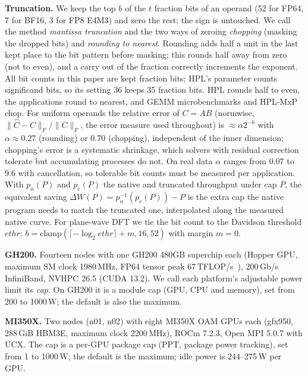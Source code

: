 \documentclass[conference]{IEEEtran}
\newcommand{\W}{\,W}
\begin{document}
\textbf{Truncation.} We keep the top $b$ of the $t$ fraction bits of an operand (52 for FP64, 7 for BF16, 3 for FP8
E4M3) and zero the rest; the sign is untouched. We call the method \emph{mantissa truncation} and the two ways of
zeroing \emph{chopping} (masking the dropped bits) and \emph{rounding to nearest}. Rounding adds half a unit in the last
kept place to the bit pattern before masking; this rounds half away from zero (not to even), and a carry out of the
fraction correctly increments the exponent. All bit counts in this paper are kept fraction bits; HPL's parameter counts
significand bits, so its setting 36 keeps 35 fraction bits. HPL rounds half to even, the applications round to nearest,
and GEMM microbenchmarks and HPL-MxP chop. For uniform operands the
relative error of $C=AB$ (normwise, $\|\hat C-C\|_F/\|C\|_F$, the error measure used throughout) is $\approx\alpha2^{-b}$ with $\alpha\approx0.27$ (rounding) or 0.70 (chopping), independent of
the inner dimension; chopping's error is a systematic shrinkage, which solvers with residual correction tolerate but
accumulating processes do not. On real data $\alpha$ ranges from 0.07 to 9.6 with cancellation, so tolerable bit counts
must be measured per application. With $p_n(P)$ and $p_r(P)$ the native and truncated throughput under cap $P$, the
equivalent saving $\Delta W(P)=p_n^{-1}(p_r(P))-P$ is the extra cap the native program needs to match the truncated one,
interpolated along the measured native curve. For plane-wave DFT we tie the bit count to the Davidson threshold
$\mathit{ethr}$: $b=\mathrm{clamp}(\lceil-\log_2\mathit{ethr}\rceil+m,16,52)$ with margin $m=0$.

\textbf{GH200.} Fourteen nodes with one GH200 480GB superchip each (Hopper GPU, maximum SM clock 1980\,MHz, FP64 tensor
peak 67\,TFLOP/s~\cite{NVIDIAGH200}), 200\,Gb/s InfiniBand, NVHPC 26.5 (CUDA 13.2). We call each platform's adjustable
power limit its \emph{cap}. On GH200 it is a module cap (GPU, CPU and memory), set from 200 to 1000\W; the default is
also the maximum.

\textbf{MI350X.} Two nodes (n01, n02) with eight MI350X OAM GPUs each (gfx950, 288\,GiB HBM3E, maximum clock 2200\,MHz), ROCm 7.2.3,
Open MPI 5.0.7 with UCX. The cap is a per-GPU package cap (PPT, package power tracking), set from 1 to 1000\W; the
default is the maximum; idle power is 244--275\W{} per GPU.
\end{document}

